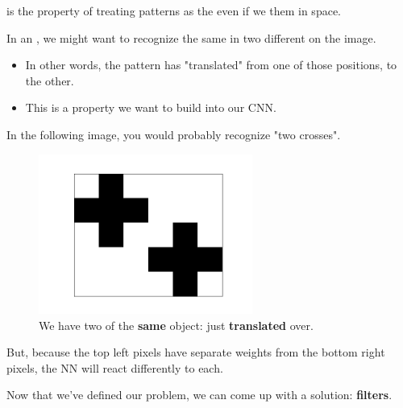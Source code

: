         \begin{definition}
             is the property of treating patterns as the  even if we  them in space.

            In an , we might want to recognize the same  in two different  on the image.

            \begin{itemize}
                \item In other words, the pattern has "translated" from one of those positions, to the other.
            \end{itemize}

            \subsecdiv

            \begin{itemize}
                \item This is a property we want to build into our CNN.
            \end{itemize}
        \end{definition}

        \miniex In the following image, you would probably recognize "two crosses".

        \begin{figure}[H]
            \centering
            \includegraphics[width=70mm,scale=0.5]{images/convolutional_neural_networks_images/two_crosses.png}
            
            \caption*{We have two of the \textbf{same} object: just \textbf{translated} over.}
        \end{figure}

        But, because the top left pixels have separate weights from the bottom right pixels, the NN will react differently to each.

        Now that we've defined our problem, we can come up with a solution: \textbf{filters}.

        
\pagebreak

